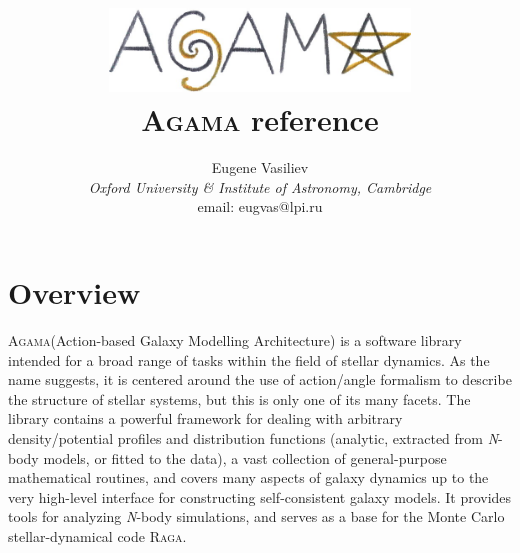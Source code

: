 \documentclass[12pt]{article}
\newcommand{\Agama}{\textsc{Agama}\xspace}
\newcommand{\Raga} {\textsc{Raga}\xspace}
\newcommand{\Nbody}{\textsl{N}-body\xspace}
\begin{document}
\title{\includegraphics[width=8cm]{agama.jpg}\protect\\[0.5cm]\Agama reference}
\author{Eugene Vasiliev\\
\normalsize\textit{Oxford University \& Institute of Astronomy, Cambridge}\\
\normalsize\textrm{email: eugvas@lpi.ru} }


\maketitle
\tableofcontents
\newpage

\section{Overview}

\Agama (Action-based Galaxy Modelling Architecture) is a software library intended for a broad range of tasks within the field of stellar dynamics. As the name suggests, it is centered around the use of action/angle formalism to describe the structure of stellar systems, but this is only one of its many facets. The library contains a powerful framework for dealing with arbitrary density/potential profiles and distribution functions (analytic, extracted from \Nbody models, or fitted to the data), a vast collection of general-purpose mathematical routines, and covers many aspects of galaxy dynamics up to the very high-level interface for constructing self-consistent galaxy models. It provides tools for analyzing \Nbody simulations, and serves as a base for the Monte Carlo stellar-dynamical code \Raga.
\end{document}
